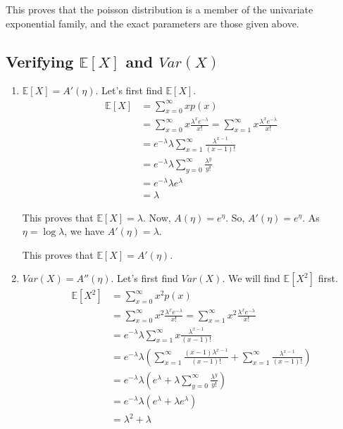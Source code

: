 \documentclass[a4paper]{article}
\begin{document}
This proves that the poisson distribution is a member of the univariate exponential family, and the exact parameters are those given above.

\subsection{Verifying $\mathbb{E}[X]$ and $Var(X)$}

\begin{enumerate}[label=(\alph*)]
    \item $\mathbb{E}[X] = A'(\eta)$. Let's first find $\mathbb{E}[X]$.
    \begin{align*}
        \mathbb{E}[X] &= \sum_{x=0}^{\infty} x p(x) \\
        &= \sum_{x=0}^{\infty} x \frac{\lambda^x e^{-\lambda}}{x!} = \sum_{x=1}^{\infty} x \frac{\lambda^x e^{-\lambda}}{x!} \\
        &= e^{-\lambda} \lambda \sum_{x=1}^{\infty} \frac{\lambda^{x-1}}{(x-1)!} \\
        &= e^{-\lambda} \lambda \sum_{y=0}^{\infty} \frac{\lambda^y}{y!} \\
        &= e^{-\lambda} \lambda e^{\lambda} \\
        &= \lambda
    \end{align*}

    This proves that $\mathbb{E}[X] = \lambda$. Now, $A(\eta) = e^\eta$. So, $A'(\eta) = e^\eta$. As $\eta = \log \lambda$, we have $A'(\eta) = \lambda$.

    This proves that $\mathbb{E}[X] = A'(\eta)$.

    \newpage
    
    \item $Var(X) = A''(\eta)$. Let's first find $Var(X)$. We will find $\mathbb{E}[X^2]$ first.
    \begin{align*}
        \mathbb{E}[X^2] &= \sum_{x=0}^{\infty} x^2 p(x) \\
        &= \sum_{x=0}^{\infty} x^2 \frac{\lambda^x e^{-\lambda}}{x!} = \sum_{x=1}^{\infty} x^2 \frac{\lambda^x e^{-\lambda}}{x!} \\
        &= e^{-\lambda} \lambda \sum_{x=1}^{\infty} x \frac{\lambda^{x-1}}{(x-1)!} \\
        &= e^{-\lambda} \lambda \left(
            \sum_{x=1}^{\infty} \frac{(x-1)\lambda^{x-1}}{(x-1)!} + \sum_{x=1}^{\infty} \frac{\lambda^{x-1}}{(x-1)!}
        \right)\\
        &= e^{-\lambda} \lambda \left(
            e^{\lambda} + \lambda \sum_{y=0}^{\infty} \frac{\lambda^y}{y!}
        \right)\\
        &= e^{-\lambda} \lambda \left(
            e^{\lambda} + \lambda e^{\lambda}
        \right)\\
        &= \lambda^2 + \lambda
    \end{align*}


\end{enumerate}
\end{document}
